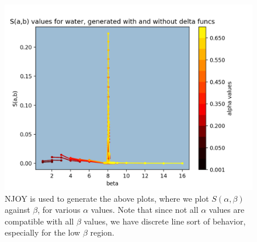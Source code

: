\documentclass[10pt]{article}
\begin{document}
\begin{multicols}{2}
            \begin{figure}[H]
              \begin{center}
              \includegraphics[scale=0.6]{sab_thinTriangle_and_delta_all_AB}
                \caption{NJOY is used to generate the above plots, where we plot $S(\alpha,\beta)$ against $\beta$, for various $\alpha$ values. Note that since not all $\alpha$ values are compatible with all $\beta$ values, we have discrete line sort of behavior, especially for the low $\beta$ region. }
              \label{fig:sabThinTriangleAllAB}
              \end{center}
            \end{figure}




\end{multicols}
\end{document}
